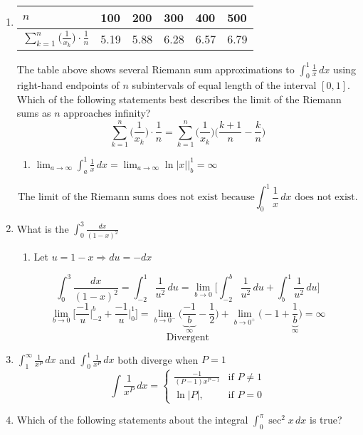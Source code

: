 \documentclass[12pt]{article}
\begin{document}
\begin{enumerate}
\item 
\begin{table}[h!]
\centering
\begin{tabular}{|l||l|l|l|l|l|}
\hline
$n$ & 100  & 200  & 300  & 400  & 500  \\ \hline
$\sum_{k=1}^{n} \biggr(\frac{1}{x_k}\biggr) \cdot \frac{1}{n}$ & 5.19 & 5.88 & 6.28 & 6.57 & 6.79 \\ \hline
\end{tabular}
\end{table}
The table above shows several Riemann sum approximations to $\int_{0}^{1} \frac{1}{x}\, dx$ using right-hand endpoints of $n$ subintervals of equal length of the interval $[0,1]$. Which of the following statements best describes the limit of the Riemann sums as $n$ approaches infinity?
$$\sum_{k=1}^{n} \biggr(\frac{1}{x_k}\biggr) \cdot \frac{1}{n} = \sum_{k=1}^{n} \biggr(\frac{1}{x_k}\biggr) \biggr(\frac{k+1}{n}-\frac{k}{n}\biggr)$$

\begin{enumerate}
    \item $\lim_{a\to\infty} \int_{a}^{1} \frac{1}{x} \, dx = \lim_{a\to\infty} \ln |x| \biggr\rvert_{b}^{1} = \infty $
\end{enumerate}
$$\boxed{\text{The limit of the Riemann sums does not exist because} \int_{0}^{1} \frac{1}{x} \, dx \text{ does not exist.}}$$
\item What is the $\int_{0}^{3} \frac{dx}{(1-x)^2}$
\begin{enumerate}
    \item Let $u=1-x \Longrightarrow du = -dx$
\end{enumerate}
$$\int_{0}^{3} \frac{dx}{(1-x)^2} = \int^{1}_{-2} \frac{1}{u^2}\, du = \lim_{b\to 0} \biggr[ \int_{-2}^{b} \frac{1}{u^2} \, du + \int_{b}^{1} \frac{1}{u^2} \, du \biggr]$$
$$\lim_{b\to 0} \Biggr[ \frac{-1}{u} \biggr\rvert_{-2}^{b} + \frac{-1}{u}\bigg\rvert_{0}^{1}\Biggr] = \lim_{b\to 0^-} \bigg(\underbrace{\frac{-1}{b}}_{\infty}-\frac{1}{2}\bigg) +  \lim_{b\to 0^+} \bigg(-1+\underbrace{\frac{1}{b}}_{\infty}\bigg) =\infty$$
$$\boxed{\text{Divergent}}$$
\item $\int_{1}^{\infty}\frac{1}{x^P}\,dx$ and $\int_{0}^{1}\frac{1}{x^P}\,dx$ both diverge when $\boxed{P = 1}$
\begin{equation}
    \int \frac{1}{x^P} \, dx = 
    \left\{
        \begin{array}{lr}
            \frac{-1}{(P-1)x^{P-1}} &\text{if } P \neq 1\\
           \ln|P|, & \text{if } P=0
        \end{array}
        \right.
    \end{equation}
\item Which of the following statements about the integral $\int_{0}^{\pi} \sec^2 x \, dx$ is true?


\end{enumerate}
\end{document}
